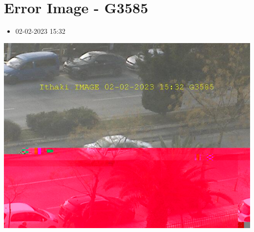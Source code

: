 \documentclass[10pt,a4paper]{article}
\begin{document}
\section*{\textlatin{Error Image - G3585}}
\begin{itemize}
  \item 02-02-2023 15:32
\end{itemize}
\begin{center}
  \includegraphics[scale=0.5]{errorImage.png}
  \newline
  \newline
  \newline
  \newline
  \newline
\end{center}
\end{document}
